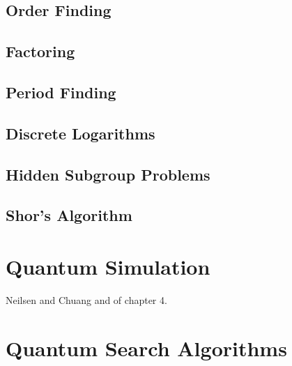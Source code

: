 \documentclass{article}
\begin{document}
  \subsection{Order Finding}

  \subsection{Factoring}

  \subsection{Period Finding} 

  \subsection{Discrete Logarithms}

  \subsection{Hidden Subgroup Problems}

  \subsection{Shor's Algorithm}


\section{Quantum Simulation}

  Neilsen and Chuang and of chapter 4. 

\section{Quantum Search Algorithms}
\end{document}
